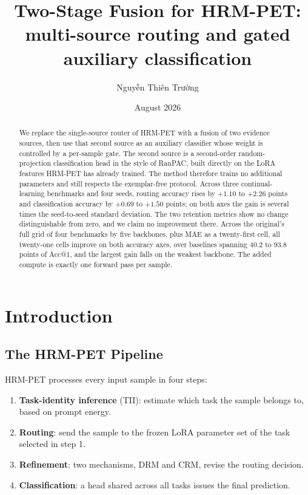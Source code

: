 \documentclass[11pt,a4paper]{article}
\title{\bfseries Two-Stage Fusion for HRM-PET:\\
multi-source routing and gated auxiliary classification}
\author{Nguyễn Thiên Trường}
\date{August 2026}
\begin{document}
\maketitle

\begin{abstract}
We replace the single-source router of HRM-PET with a fusion of two evidence
sources, then use that second source as an auxiliary classifier whose weight is
controlled by a per-sample gate. The second source is a second-order
random-projection classification head in the style of RanPAC, built directly on
the LoRA features HRM-PET has already trained. The method therefore trains no
additional parameters and still respects the exemplar-free protocol. Across
three continual-learning benchmarks and four seeds, routing accuracy rises by
$+1.10$ to $+2.26$ points and classification accuracy by $+0.69$ to $+1.50$
points; on both axes the gain is several times the seed-to-seed standard
deviation. The two retention metrics show no change distinguishable from zero,
and we claim no improvement there. Across the original's full grid of four
benchmarks by five backbones, plus MAE as a twenty-first cell, all twenty-one
cells improve on both accuracy axes, over baselines spanning $40.2$ to $93.8$
points of Acc@1, and the largest gain falls on the weakest backbone. The added compute is exactly one forward pass
per sample.
\end{abstract}

\tableofcontents
\bigskip

\section{Introduction}

\subsection{The HRM-PET Pipeline}

HRM-PET processes every input sample in four steps:

\begin{enumerate}[leftmargin=*, itemsep=2pt]
\item \textbf{Task-identity inference} (TII): estimate which task the sample
      belongs to, based on prompt energy.
\item \textbf{Routing}: send the sample to the frozen LoRA parameter set of the
      task selected in step 1.
\item \textbf{Refinement}: two mechanisms, DRM and CRM, revise the routing
      decision.
\item \textbf{Classification}: a head shared across all tasks issues the final
      prediction.
\end{enumerate}
\end{document}
